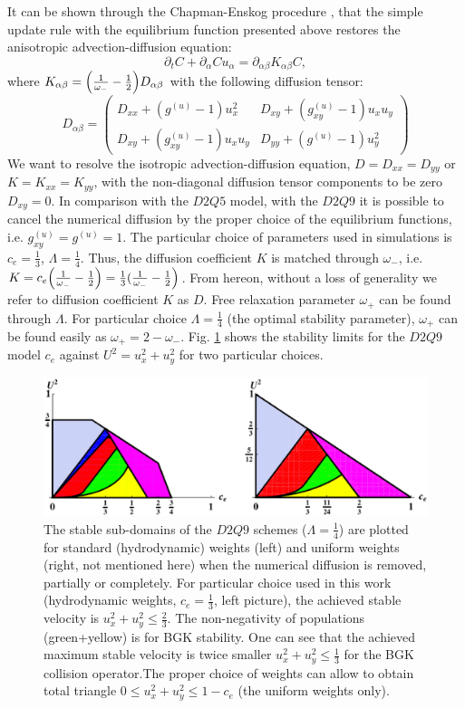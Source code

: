 \documentclass{article}
\newcommand{\beq}{\begin{equation}}
\newcommand{\feq}{\end{equation}}
\newcommand{\omegaplus}{\omega_{+}}
\newcommand{\omegaminus}{\omega_{-}}
\begin{document}
It can be shown through the Chapman-Enskog procedure \cite{chapman}, that the simple update rule
with the equilibrium function presented above restores the anisotropic
advection-diffusion equation:
\beq
\partial_t C+ \partial_{\alpha} C u_{\alpha}=\partial_{\alpha\beta} K_{\alpha\beta} C,
\feq
where $K_{\alpha\beta}=\Bigl(\frac{1}{\omegaminus}-\frac{1}{2}\Bigr)D_{\alpha\beta}$
with the
following diffusion tensor:
\begin{equation}
D_{\alpha\beta}=
\begin{pmatrix}
D_{xx} + (g^{(u)}-1) u_x^2 & D_{xy}+(g_{xy}^{(u)}-1)u_x u_y\\
D_{xy} + (g_{xy}^{(u)}-1) u_x u_y& D_{yy}+(g^{(u)}-1) u_y^2 
\end{pmatrix}
\end{equation}
We want to resolve the isotropic advection-diffusion equation, $D=D_{xx}=D_{yy}$ or $K=K_{xx}=K_{yy}$, with the non-diagonal diffusion tensor components to be zero $D_{xy}=0$. In comparison with the $D2Q5$ model, with the $D2Q9$ it is
possible to cancel the numerical diffusion by the proper choice
of the equilibrium functions, i.e. $g_{xy}^{(u)}=g^{(u)}=1$.  The particular choice of parameters used in simulations is $c_e=\frac{1}{3}$, $\Lambda=\frac{1}{4}$. Thus, the diffusion coefficient $K$ is matched through $\omegaminus$, i.e. $K=c_e \Bigl(\frac{1}{\omegaminus}-\frac{1}{2}\Bigr)=\frac{1}{3}(\frac{1}{\omegaminus}-\frac{1}{2}\Bigr)$. From hereon, without a loss of generality we refer to diffusion coefficient 
$K$ as $D$.  Free relaxation parameter $\omegaplus$ can be found through $\Lambda$. For particular choice $\Lambda=\frac{1}{4}$ (the optimal stability parameter), $\omegaplus$ can be found easily as $\omegaplus=2-\omegaminus$.  Fig. \ref{stability:d2q9} shows the stability limits for the $D2Q9$ model $c_e$ against $U^2=u_x^2+u_y^2$ for two particular choices.
\begin{figure}[htb!]
\includegraphics[width=\textwidth]{Figures/d2q9_stability.eps}
\caption{The stable sub-domains of the $D2Q9$ schemes ($\Lambda=\frac{1}{4}$)
are plotted for standard (hydrodynamic) weights (left) and uniform weights (right, not mentioned here) when the
numerical diffusion is removed, partially or completely. For particular choice used in this work (hydrodynamic weights, $c_e=\frac{1}{3}$, left picture), the achieved stable velocity is $u_x^2+u_y^2\leq\frac{2}{3}$. The non-negativity of populations (green+yellow) is for BGK stability. One can see that the achieved maximum stable velocity is twice smaller $u_x^2+u_y^2\leq \frac{1}{3}$ for the BGK collision operator.The proper choice of weights can
allow to obtain  total triangle $0 \leq u_x^2+u_y^2 \leq 1- c_e$ (the
uniform weights only).
\label{stability:d2q9}}
\end{figure}
\end{document}
